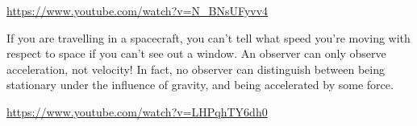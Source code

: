 \documentclass[a4paper]{amsbook}
\begin{document}
\begin{center}
\begin{tcolorbox}[width=0.8\textwidth,colback={red},title={\textbf{Go and watch...}},colbacktitle=yellow,coltitle=blue]
  \textcolor{white}{\url{https://www.youtube.com/watch?v=N_BNsUFyvv4}}
\end{tcolorbox}
\end{center}

If you are travelling in a spacecraft, you can't tell what speed you're moving with respect to space if you can't see
out a window. An observer can only observe acceleration, not velocity! In fact, no observer can distinguish between
being stationary under the influence of gravity, and being accelerated by some force.

\begin{center}
\begin{tcolorbox}[width=0.8\textwidth,colback={red},title={\textbf{Go and watch...}},colbacktitle=yellow,coltitle=blue]
  \textcolor{white}{\url{https://www.youtube.com/watch?v=LHPqhTY6dh0}}
\end{tcolorbox}
\end{center}
\end{document}
